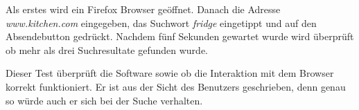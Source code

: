 Als erstes wird ein Firefox Browser geöffnet. Danach die Adresse \textit{www.kitchen.com} eingegeben, das Suchwort \textit{fridge} eingetippt und auf den Absendebutton gedrückt. Nachdem fünf Sekunden gewartet wurde wird überprüft ob mehr als drei Suchresultate gefunden wurde.

Dieser Test überprüft die Software sowie ob die Interaktion mit dem Browser korrekt funktioniert. Er ist aus der Sicht des Benutzers geschrieben, denn genau so würde auch er sich bei der Suche verhalten.